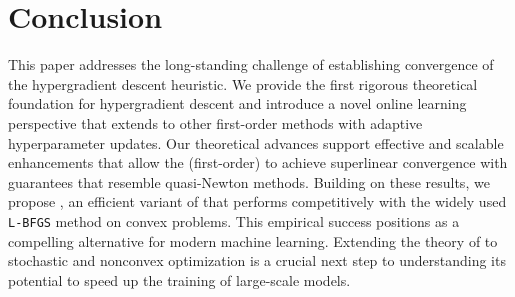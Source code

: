 \section{Conclusion}
This paper addresses the long-standing challenge of establishing convergence of the hypergradient descent heuristic. We provide the first rigorous theoretical foundation for hypergradient descent and introduce a novel online learning perspective that extends to other first-order methods with adaptive hyperparameter updates. Our theoretical advances support effective and scalable enhancements that allow the (first-order) {\hdm} to achieve superlinear convergence with guarantees that resemble quasi-Newton methods. 
Building on these results, we propose {\hdmbest}, an efficient variant of {\hdm} that performs competitively with the widely used \texttt{L-BFGS} method on convex problems. This empirical success positions {\hdm} as a compelling alternative for modern machine learning. Extending the theory of {\hdm} to stochastic and nonconvex optimization is a crucial next step to understanding its potential to speed up the training of large-scale models.
